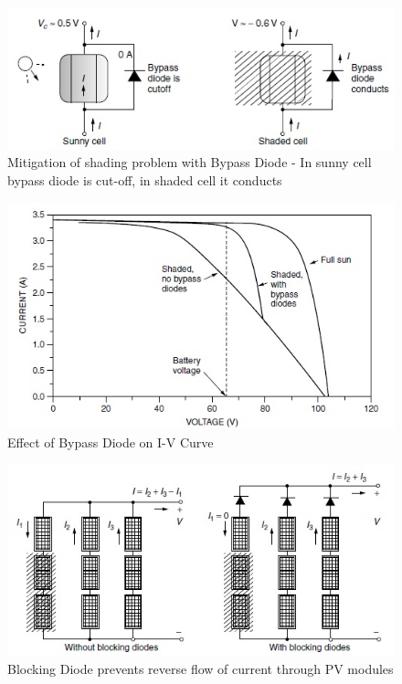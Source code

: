 \documentclass[12pt]{article}
\begin{document}
\begin{figure}[H]
\centering
\includegraphics[scale=0.5]{bydiode1}
\caption{Mitigation of shading problem with Bypass Diode - In sunny cell bypass diode is cut-off, in shaded cell it conducts}
\label{figc3h100} %
\end{figure}

\begin{figure}[H]
\centering
\includegraphics[scale=0.5]{bydiode2}
\caption{Effect of Bypass Diode on I-V Curve}
\label{figc3h190} %
\end{figure}

\begin{figure}[H]
\centering
\includegraphics[scale=0.5]{bldiode1}
\caption{Blocking Diode prevents reverse flow of current through PV modules}
\label{figc3h200} %
\end{figure}
\end{document}
